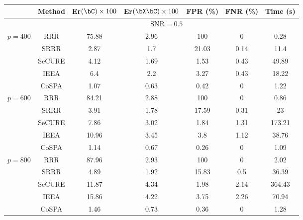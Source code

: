 \begin{tabular}{lcccccc} 
\toprule 
& Method & Er$(\bC)\times 100$ & Er$(\bX\bC)\times 100$ & FPR (\%) & FNR (\%) & Time (s) \\ 
\midrule 
 & \multicolumn{6}{c}{$\text{SNR}=0.5$} \\ 
\multirow{5}{*}{$p=400$} & RRR & 75.88 & 2.96 & 100 & 0 & 0.28 \\ 
 & SRRR & 2.87 & 1.7 & 21.03 & 0.14 & 11.4 \\ 
 & SeCURE & 4.12 & 1.69 & 1.53 & 0.43 & 49.89 \\ 
 & IEEA & 6.4 & 2.2 & 3.27 & 0.43 & 18.22 \\ 
 & CoSPA & 1.07 & 0.63 & 0.42 & 0 & 1.22 \\ 
\hline 
\multirow{5}{*}{$p=600$} & RRR & 84.21 & 2.88 & 100 & 0 & 0.86 \\ 
 & SRRR & 3.91 & 1.78 & 17.59 & 0.31 & 23 \\ 
 & SeCURE & 7.86 & 3.02 & 1.84 & 1.31 & 173.21 \\ 
 & IEEA & 10.96 & 3.45 & 3.8 & 1.12 & 38.76 \\ 
 & CoSPA & 1.14 & 0.67 & 0.26 & 0 & 1.09 \\ 
\hline 
\multirow{5}{*}{$p=800$} & RRR & 87.96 & 2.93 & 100 & 0 & 2.02 \\ 
 & SRRR & 4.89 & 1.92 & 15.83 & 0.5 & 36.39 \\ 
 & SeCURE & 11.87 & 4.34 & 1.98 & 2.14 & 364.43 \\ 
 & IEEA & 15.86 & 4.22 & 3.75 & 2.26 & 70.94 \\ 
 & CoSPA & 1.46 & 0.73 & 0.36 & 0 & 1.28 \\ 
\bottomrule 
\end{tabular} 
